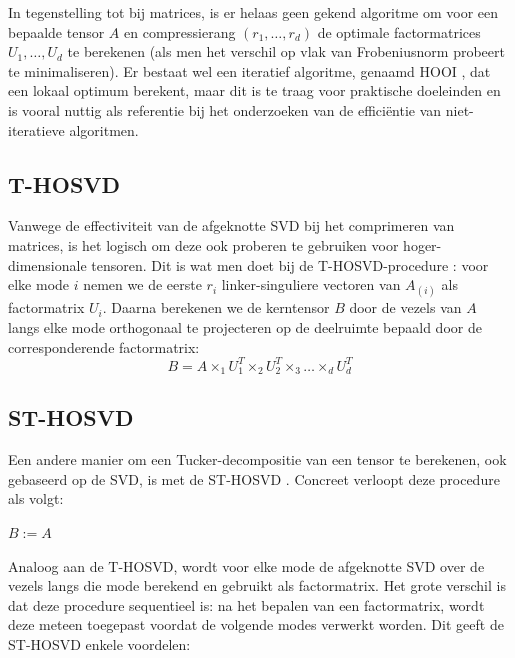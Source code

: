 In tegenstelling tot bij matrices, is er helaas geen gekend algoritme om voor een bepaalde tensor $A$ en compressierang $(r_1, \dots, r_d)$ de optimale factormatrices $U_1, \dots, U_d$ te berekenen (als men het verschil op vlak van Frobeniusnorm probeert te minimaliseren). Er bestaat wel een iteratief algoritme, genaamd HOOI \cite{ref:kolda}, dat een lokaal optimum berekent, maar dit is te traag voor praktische doeleinden en is vooral nuttig als referentie bij het onderzoeken van de effici\"entie van niet-iteratieve algoritmen.

\subsection{T-HOSVD}

Vanwege de effectiviteit van de afgeknotte SVD bij het comprimeren van matrices, is het logisch om deze ook proberen te gebruiken voor hoger-dimensionale tensoren. Dit is wat men doet bij de T-HOSVD-procedure \cite{ref:kolda}: voor elke mode $i$ nemen we de eerste $r_i$ linker-singuliere vectoren van $A_{(i)}$ als factormatrix $U_i$. Daarna berekenen we de kerntensor $B$ door de vezels van $A$ langs elke mode orthogonaal te projecteren op de deelruimte bepaald door de corresponderende factormatrix:
\[
B = A \times_1 U_1^T \times_2 U_2^T \times_3 \dots \times_d U_d^T
\]

\subsection{ST-HOSVD}

Een andere manier om een Tucker-decompositie van een tensor te berekenen, ook gebaseerd op de SVD, is met de ST-HOSVD \cite{ref:st_hosvd}. Concreet verloopt deze procedure als volgt:\\

\begin{algorithm}[H]
$B := A$\\
\end{algorithm}

Analoog aan de T-HOSVD, wordt voor elke mode de afgeknotte SVD over de vezels langs die mode berekend en gebruikt als factormatrix. Het grote verschil is dat deze procedure sequentieel is: na het bepalen van een factormatrix, wordt deze meteen toegepast voordat de volgende modes verwerkt worden. Dit geeft de ST-HOSVD enkele voordelen:

